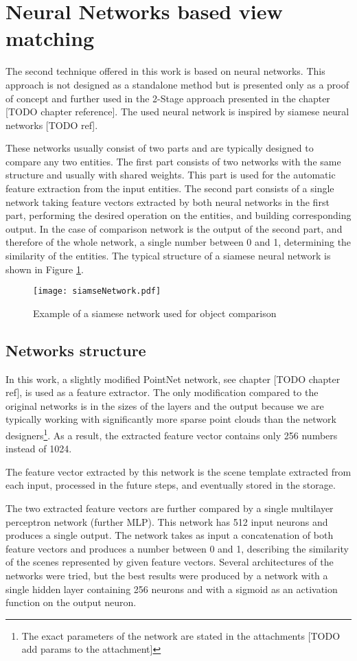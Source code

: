 \section{Neural Networks based view matching}

The second technique offered in this work is based on neural networks. This approach is not designed as a standalone method but is presented only as a proof of concept and further used in the 2-Stage approach presented in the chapter [TODO chapter reference]. The used neural network is inspired by siamese neural networks [TODO ref].\par
These networks usually consist of two parts and are typically designed to compare any two entities. The first part consists of two networks with the same structure and usually with shared weights. This part is used for the automatic feature extraction from the input entities. The second part consists of a single network taking feature vectors extracted by both neural networks in the first part, performing the desired operation on the entities, and building corresponding output. In the case of comparison network is the output of the second part, and therefore of the whole network, a single number between 0 and 1, determining the similarity of the entities. The typical structure of a siamese neural network is shown in Figure \ref{fig:siamseNetwork}.

\begin{figure}[htpb]
    \centering
    \texttt{[image: siamseNetwork.pdf]}
    \caption{Example of a siamese network used for object comparison} \label{fig:siamseNetwork}
\end{figure}

\subsection{Networks structure}

In this work, a slightly modified PointNet network, see chapter [TODO chapter ref], is used as a feature extractor. The only modification compared to the original networks is in the sizes of the layers and the output because we are typically working with significantly more sparse point clouds than the network designers\footnote{The exact parameters of the network are stated in the attachments [TODO add params to the attachment]}. As a result, the extracted feature vector contains only 256 numbers instead of 1024.\par
The feature vector extracted by this network is the scene template extracted from each input, processed in the future steps, and eventually stored in the storage.\par
The two extracted feature vectors are further compared by a single multilayer perceptron network (further MLP). This network has 512 input neurons and produces a single output. The network takes as input a concatenation of both feature vectors and produces a number between 0 and 1, describing the similarity of the scenes represented by given feature vectors. Several architectures of the networks were tried, but the best results were produced by a network with a single hidden layer containing 256 neurons and with a sigmoid as an activation function on the output neuron.

